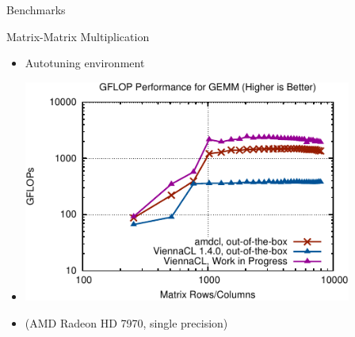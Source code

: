 \begin{frame}{Benchmarks}

 \begin{block}{Matrix-Matrix Multiplication}
  \begin{itemize}
   \item Autotuning environment 
   \item \includegraphics[width=0.85\textwidth]{figures/gemm3.pdf}
   \item \centering (AMD Radeon HD 7970, single precision)
  \end{itemize}

 \end{block}

\end{frame}


